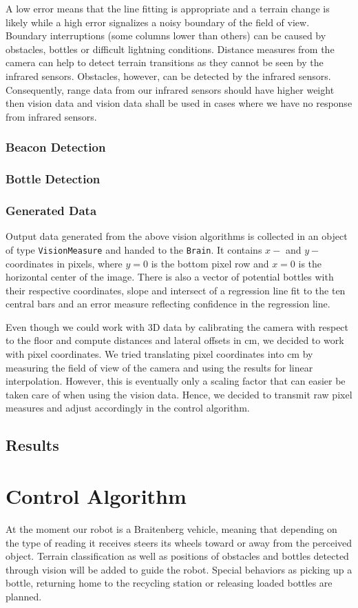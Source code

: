 A low error means that the line fitting is appropriate and a terrain change is likely
while a high error signalizes a noisy boundary of the field of view. Boundary interruptions
(some columns lower than others) can be caused by obstacles, bottles or difficult lightning
conditions. Distance measures from the camera can help to detect 
terrain transitions as they cannot be seen by the infrared sensors. Obstacles,
however, can be detected by the infrared sensors. Consequently, range data from 
our infrared sensors should have higher weight then vision data and vision data
shall be used in cases where we have no response from infrared sensors.


\subsubsection{Beacon Detection}


\subsubsection{Bottle Detection}

\subsubsection{Generated Data}
Output data generated from the above vision algorithms is collected in an object of type
\texttt{VisionMeasure} and handed to the \texttt{Brain}. It contains $x-$ and $y-$coordinates
in pixels, where $y=0$ is the bottom pixel row and $x=0$ is the horizontal center of the
image. There is also a vector of potential bottles with their respective coordinates,
slope and intersect of a regression line fit to the ten central bars and an error measure
reflecting confidence in the regression line.

Even though we could work with 3D data by calibrating the camera with respect to the
floor and compute distances and lateral offsets in cm, we decided to work with pixel
coordinates. We tried translating pixel coordinates into cm by measuring the field of view
of the camera and using the results for linear interpolation. However, this is eventually
only a scaling factor that can easier be taken care of when using the vision data. Hence,
we decided to transmit raw pixel measures and adjust accordingly in the control algorithm.

\subsection{Results}

\section{Control Algorithm}
At the moment our robot is a Braitenberg vehicle, meaning that depending on the type
of reading it receives steers its wheels toward or away from the perceived object. 
Terrain classification as well as positions of obstacles and bottles detected through 
vision will be added to guide the robot. Special behaviors as picking up a bottle, 
returning home to the recycling station or releasing loaded bottles are planned.
